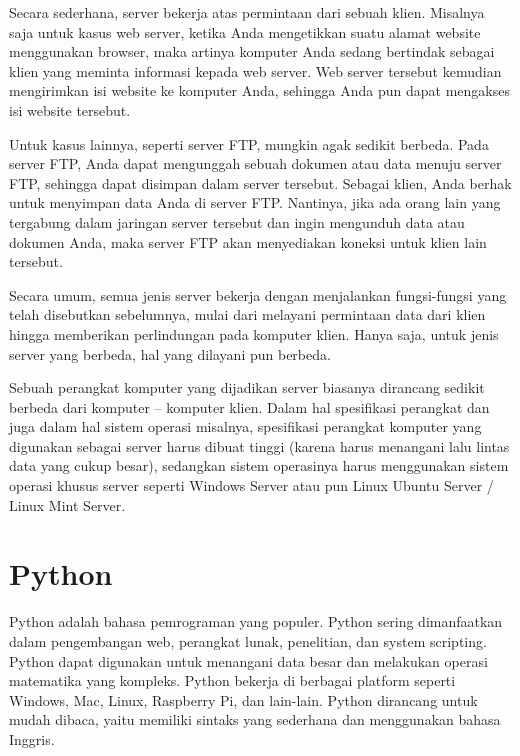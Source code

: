 \par Secara sederhana, server bekerja atas permintaan dari sebuah klien. Misalnya saja untuk kasus web server, ketika Anda mengetikkan suatu alamat website menggunakan browser, maka artinya komputer Anda sedang bertindak sebagai klien yang meminta informasi kepada web server. Web server tersebut kemudian mengirimkan isi website ke komputer Anda, sehingga Anda pun dapat mengakses isi website tersebut.

\par Untuk kasus lainnya, seperti server FTP, mungkin agak sedikit berbeda. Pada server FTP, Anda dapat mengunggah sebuah dokumen atau data menuju server FTP, sehingga dapat disimpan dalam server tersebut. Sebagai klien, Anda berhak untuk menyimpan data Anda di server FTP. Nantinya, jika ada orang lain yang tergabung dalam jaringan server tersebut dan ingin mengunduh data atau dokumen Anda, maka server FTP akan menyediakan koneksi untuk klien lain tersebut.

\par Secara umum, semua jenis server bekerja dengan menjalankan fungsi-fungsi yang telah disebutkan sebelumnya, mulai dari melayani permintaan data dari klien hingga memberikan perlindungan pada komputer klien. Hanya saja, untuk jenis server yang berbeda, hal yang dilayani pun berbeda.

\par Sebuah perangkat komputer yang dijadikan server biasanya dirancang sedikit berbeda dari komputer – komputer klien. Dalam hal spesifikasi perangkat dan juga dalam hal sistem operasi misalnya, spesifikasi perangkat komputer yang digunakan sebagai server harus dibuat tinggi (karena harus menangani lalu lintas data yang cukup besar), sedangkan sistem operasinya harus menggunakan sistem operasi khusus server seperti Windows Server atau pun Linux Ubuntu Server / Linux Mint Server\cite{server_def}.

\section{Python}
\par Python adalah bahasa pemrograman yang populer. Python sering dimanfaatkan dalam pengembangan web, perangkat lunak, penelitian, dan system scripting. Python dapat digunakan untuk menangani data besar dan melakukan operasi matematika yang kompleks. Python bekerja di berbagai platform seperti Windows, Mac, Linux, Raspberry Pi, dan lain-lain. Python dirancang untuk mudah dibaca, yaitu memiliki sintaks yang sederhana dan
menggunakan bahasa Inggris\cite{python_def}.

